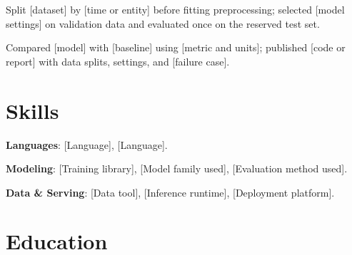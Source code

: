 \documentclass{resume}
\begin{document}
\begin{jobduties}
  \item Split [dataset] by [time or entity] before fitting preprocessing; selected [model settings] on validation data and evaluated once on the reserved test set.
  \item Compared [model] with [baseline] using [metric and units]; published [code or report] with data splits, settings, and [failure case].
\end{jobduties}

\section{Skills}
\begin{skillitems}
  \item \textbf{Languages}: [Language], [Language].
  \item \textbf{Modeling}: [Training library], [Model family used], [Evaluation method used].
  \item \textbf{Data \& Serving}: [Data tool], [Inference runtime], [Deployment platform].
\end{skillitems}

\section{Education}
\end{document}
